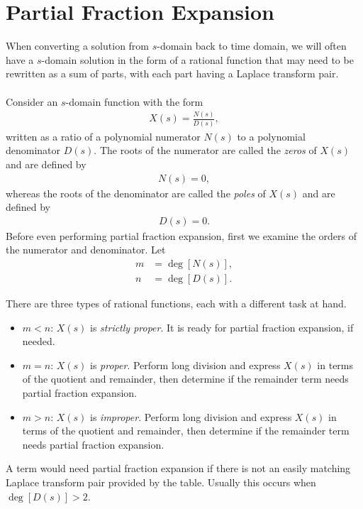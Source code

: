 \documentclass{report}
\begin{document}
\section{Partial Fraction Expansion}
When converting a solution from $s$-domain back to time domain, we will often have a $s$-domain solution in the form of a rational function that may need to be rewritten as a sum of parts, with 
each part having a Laplace transform pair.
\\ \\
Consider an $s$-domain function with the form
\begin{align}
    X(s) = \frac{N(s)}{D(s)},
\end{align}
written as a ratio of a polynomial numerator $N(s)$ to a polynomial denominator $D(s)$. 
The roots of the numerator are called the \emph{zeros} of $X(s)$ and are defined by 
\begin{align}
    N(s) = 0,
\end{align}
whereas the roots of the denominator are called the \emph{poles} of $X(s)$ and are defined by 
\begin{align}
    D(s) = 0.
\end{align}
Before even performing partial fraction expansion, first we examine the orders of the numerator and denominator. Let 
\begin{align}
    m &= \deg[N(s)], \\ 
    n &= \deg[D(s)].
\end{align}
\begin{tcolorbox}[width=\textwidth,colback={white}, sharp corners]
    There are three types of rational functions, each with a different task at hand.
    \begin{itemize}
        \item $m < n$: $X(s)$ is \emph{strictly proper}. It is ready for partial fraction expansion, if needed.
        \item $m = n$: $X(s)$ is \emph{proper}. Perform long division and express $X(s)$ in terms of the quotient and remainder, then determine if the remainder term needs partial fraction expansion.
        \item $m > n$: $X(s)$ is \emph{improper}. Perform long division and express $X(s)$ in terms of the quotient and remainder, then determine if the remainder term needs partial fraction expansion.
    \end{itemize}
\end{tcolorbox}
\noindent A term would need partial fraction expansion if there is not an easily matching Laplace transform pair provided by the table. Usually this occurs when $\deg[D(s)]>2$.
\end{document}
